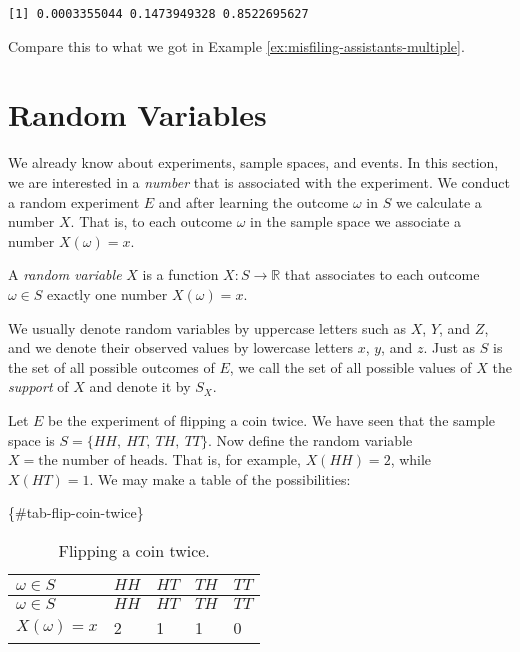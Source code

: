 \documentclass[]{book}
\numberwithin{equation}{chapter}
\numberwithin{figure}{chapter}
\theoremstyle{plain}
\theoremstyle{definition}
\theoremstyle{remark}
\theoremstyle{definition}
\theoremstyle{definition}
\theoremstyle{remark}
\let\BeginKnitrBlock\begin \let\EndKnitrBlock\end
\begin{document}
\begin{verbatim}
[1] 0.0003355044 0.1473949328 0.8522695627
\end{verbatim}

Compare this to what we got in Example
\ref{ex:misfiling-assistants-multiple}.

\section{Random Variables}\label{sec-random-variables}

We already know about experiments, sample spaces, and events. In this
section, we are interested in a \emph{number} that is associated with
the experiment. We conduct a random experiment \(E\) and after learning
the outcome \(\omega\) in \(S\) we calculate a number \(X\). That is, to
each outcome \(\omega\) in the sample space we associate a number
\(X(\omega)=x\).

\bigskip

\BeginKnitrBlock{definition}
\protect\hypertarget{def:unnamed-chunk-184}{}{\label{def:unnamed-chunk-184}}A
\emph{random variable} \(X\) is a function \(X:S\to\mathbb{R}\) that
associates to each outcome \(\omega\in S\) exactly one number
\(X(\omega)=x\).
\EndKnitrBlock{definition}

We usually denote random variables by uppercase letters such as \(X\),
\(Y\), and \(Z\), and we denote their observed values by lowercase
letters \(x\), \(y\), and \(z\). Just as \(S\) is the set of all
possible outcomes of \(E\), we call the set of all possible values of
\(X\) the \emph{support} of \(X\) and denote it by \(S_{X}\).

\bigskip

\BeginKnitrBlock{example}
\protect\hypertarget{ex:unnamed-chunk-185}{}{\label{ex:unnamed-chunk-185}}Let
\(E\) be the experiment of flipping a coin twice. We have seen that the
sample space is \(S = \{ HH,\ HT,\ TH,\ TT \}\). Now define the random
variable \(X = \mbox{the number of heads}\). That is, for example,
\(X(HH)=2\), while \(X(HT)=1\). We may make a table of the
possibilities:
\EndKnitrBlock{example}

\{\#tab-flip-coin-twice\}

\begin{longtable}[]{@{}lllll@{}}
\caption{Flipping a coin twice.}\tabularnewline
\toprule
\(\omega\in S\) & \(HH\) & \(HT\) & \(TH\) & \(TT\)\tabularnewline
\midrule
\endfirsthead
\toprule
\(\omega\in S\) & \(HH\) & \(HT\) & \(TH\) & \(TT\)\tabularnewline
\midrule
\endhead
\(X(\omega)=x\) & 2 & 1 & 1 & 0\tabularnewline
\bottomrule
\end{longtable}
\end{document}
